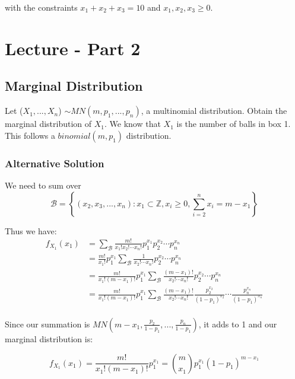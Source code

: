 \documentclass{article}
\begin{document}
\noindent with the constraints $x_1 + x_2 + x_3 = 10$ and $x_1, x_2, x_3 \geq 0$.

\section{Lecture - Part 2}

\subsection{Marginal Distribution}

Let ($X_1,...,X_n$) $\sim MN(m,p_1,...,p_n)$, a multinomial distribution. Obtain the marginal distribution of $X_1$. We know that $X_1$ is the number of balls in box 1. This follows a $binomial(m,p_1)$ distribution.

\subsubsection*{Alternative Solution}

We need to sum over
\begin{equation*}
    \mathcal{B} = \left\{ (x_2,x_3,...,x_n): x_1 \subset \mathbb{Z}, x_i \geq 0, \sum_{i=2}^n x_i = m-x_1 \right\}
\end{equation*}

\noindent Thus we have:
\begin{equation*}
\begin{split}
    f_{X_1}(x_1) &= \sum_{\mathcal{B}} \frac{m!}{x_1!x_2!\cdots x_n!} p_1^{x_1}p_2^{x_2}\cdots p_n^{x_n}\\
        &= \frac{m!}{x_1!} p_1^{x_1} \sum_{\mathcal{B}} \frac{1}{x_2!\cdots x_n!}p_2^{x_2}\cdots p_n^{x_n}\\
        &= \frac{m!}{x_1!(m-x_1)!} p_1^{x_1} \sum_{\mathcal{B}} \frac{(m-x_1)!}{x_2!\cdots x_n!}p_2^{x_2}\cdots p_n^{x_n}\\
        &= \frac{m!}{x_1!(m-x_1)!} p_1^{x_1} \sum_{\mathcal{B}} \frac{(m-x_1)!}{x_2!\cdots x_n!} \frac{p_2^{x_2}}{(1-p_1)^{x_2}} \cdots \frac{p_n^{x_n}}{(1-p_1)^{x_n}}\\
\end{split}
\end{equation*}

\noindent Since our summation is $MN(m-x_1, \frac{p_2}{1-p_1}, ..., \frac{p_n}{1-p_1})$, it adds to 1 and our marginal distribution is:

\begin{equation*}
    f_{X_1}(x_1) = \frac{m!}{x_1!(m-x_1)!} p_1^{x_1} = {m\choose x_1} p_1^{x_1}(1-p_1)^{m-x_1}
\end{equation*}
\end{document}
